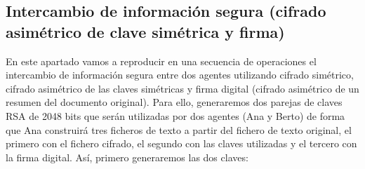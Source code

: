 \subsection{Intercambio de información segura (cifrado asimétrico de clave simétrica y firma)}
En este apartado vamos a reproducir en una secuencia de operaciones el intercambio de información
segura entre dos agentes utilizando cifrado simétrico, cifrado asimétrico de las claves simétricas y
firma digital (cifrado asimétrico de un resumen del documento original).
Para ello, generaremos dos parejas de claves RSA de 2048 bits que serán utilizadas por dos agentes
(Ana y Berto) de forma que Ana construirá tres ficheros de texto a partir del fichero de texto original,
el primero con el fichero cifrado, el segundo con las claves utilizadas y el tercero con la firma digital.
Así, primero generaremos las dos claves:
